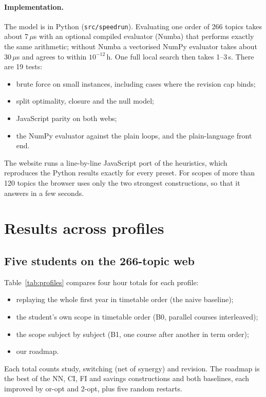 \documentclass[11pt,a4paper]{article}
\begin{document}
\paragraph{Implementation.} The model is in Python (\texttt{src/speedrun}). Evaluating one order of 266 topics takes about 7\,$\mu$s with an optional compiled evaluator (Numba) that performs exactly the same arithmetic; without Numba a vectorised NumPy evaluator takes about 30\,$\mu$s and agrees to within $10^{-12}$\,h. One full local search then takes 1--3\,s. There are 19 tests:
\begin{itemize}
\item brute force on small instances, including cases where the revision cap binds;
\item split optimality, closure and the null model;
\item JavaScript parity on both webs;
\item the NumPy evaluator against the plain loops, and the plain-language front end.
\end{itemize}
The website runs a line-by-line JavaScript port of the heuristics, which reproduces the Python results exactly for every preset. For scopes of more than 120 topics the browser uses only the two strongest constructions, so that it answers in a few seconds.

\section{Results across profiles}
\label{sec:results}
\subsection{Five students on the 266-topic web}
Table~\ref{tab:profiles} compares four hour totals for each profile:
\begin{itemize}
\item replaying the whole first year in timetable order (the naive baseline);
\item the student's own scope in timetable order (B0, parallel courses interleaved);
\item the scope subject by subject (B1, one course after another in term order);
\item our roadmap.
\end{itemize}
Each total counts study, switching (net of synergy) and revision. The roadmap is the best of the NN, CI, FI and savings constructions and both baselines, each improved by or-opt and 2-opt, plus five random restarts.
\end{document}
